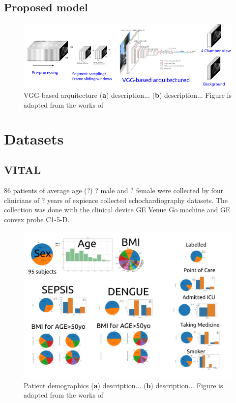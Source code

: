 \subsection{Proposed model}
\begin{figure}[h]
\centerline{
\includegraphics[width=\columnwidth]{../figures/VGG-based-arquitecture/versions/drawing-v00}
}
\caption{
	VGG-based arquitecture
	(\textbf{a}) description...
	(\textbf{b}) description...
	Figure is adapted from the works of %
}
\end{figure}



\section{Datasets}

\subsection{VITAL}
86 patients of average age (?) ? male and ? female were collected by four clinicians of ? years of expience collected echochardiography datasets.
The collection was done with the clinical device GE Venue Go machine and GE convex probe C1-5-D.

\begin{figure}[h]
\includegraphics[width=\columnwidth]{../figures/patient-demographics-and-diseases/versions/drawing-v00}
\caption{
	Patient demographics
	(\textbf{a}) description...
	(\textbf{b}) description...
	Figure is adapted from the works of %
}
\end{figure}


